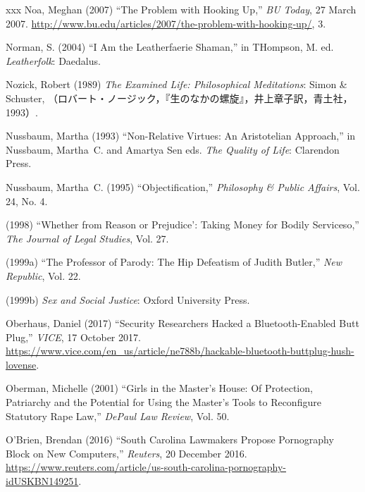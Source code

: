 \documentclass[]{jlreq} \usepackage{mystyle}
\begin{document}
\begin{thebibliography}{xxx}
Noa, Meghan (2007) ``The Problem with Hooking Up,'' \emph{BU Today}, 27 March
  2007. \url{http://www.bu.edu/articles/2007/the-problem-with-hooking-up/}, 3.

Norman, S. (2004) ``I Am the Leatherfaerie Shaman,'' in THompson, M. ed.
  \textit{ Leatherfolk}: Daedalus.

Nozick, Robert (1989)  \textit{ The Examined Life: Philosophical Meditations}:
  Simon \& Schuster,
  （ロバート・ノージック，『生のなかの螺旋』，井上章子訳，青土社，1993）.

Nussbaum, Martha (1993) ``Non-Relative Virtues: An Aristotelian Approach,'' in
  Nussbaum, Martha~C. and Amartya Sen eds.   \textit{ The Quality of Life}:
  Clarendon Press.

Nussbaum, Martha~C. (1995) ``Objectification,'' \textit{ Philosophy \& Public
  Affairs}, Vol. 24, No. 4.

 \bysame{}  (1998) ``Whether from Reason or Prejudice': Taking Money for Bodily
  Serviceso,'' \textit{ The Journal of Legal Studies}, Vol. 27.

 \bysame{}  (1999a) ``The Professor of Parody: The Hip Defeatism of Judith
  Butler,'' \textit{ New Republic}, Vol. 22.

 \bysame{}  (1999b)  \textit{ Sex and Social Justice}: Oxford University Press.

Oberhaus, Daniel (2017) ``Security Researchers Hacked a Bluetooth-Enabled Butt
  Plug,'' \emph{VICE}, 17 October 2017.
  \url{https://www.vice.com/en_us/article/ne788b/hackable-bluetooth-buttplug-hush-lovense}.

Oberman, Michelle (2001) ``Girls in the Master's House: Of Protection,
  Patriarchy and the Potential for Using the Master's Tools to Reconfigure
  Statutory Rape Law,'' \textit{ DePaul Law Review}, Vol. 50.

O'Brien, Brendan (2016) ``South Carolina Lawmakers Propose Pornography Block on
  New Computers,'' \emph{Reuters}, 20 December 2016.
  \url{https://www.reuters.com/article/us-south-carolina-pornography-idUSKBN149251}.


\end{thebibliography}
\end{document}
